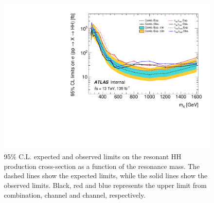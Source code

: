 \documentclass[twoside,11pt]{report}
\begin{document}
    \begin{figure}[htbp]
        \centering
        \includegraphics[width=.8\textwidth]{figures/results/HH/Combined/CombSysts_21072021.pdf}
        \caption{95\% C.L. expected and observed limits on the resonant HH production cross-section as a function of the resonance mass. 
        The dashed lines show the expected limits, while the solid lines show the observed limits. 
        Black, red and blue represents the upper limit from combination, \lephad channel and \hadhad channel, respectively.}
        \label{fig:CombinedLimits}
        \end{figure}
\end{document}

